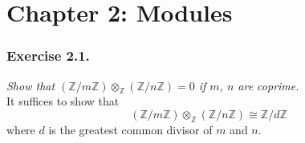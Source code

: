 \documentclass{article}
\begin{document}



\newpage
\section*{Chapter 2: Modules \\}



\subsubsection*{Exercise 2.1.}
\emph{Show that
$(\mathbb{Z}/m\mathbb{Z}) \otimes_{\mathbb{Z}} (\mathbb{Z}/n\mathbb{Z}) = 0$
if $m$, $n$ are coprime.} \\

It suffices to show that
$$(\mathbb{Z}/m\mathbb{Z}) \otimes_{\mathbb{Z}} (\mathbb{Z}/n\mathbb{Z})
\cong \mathbb{Z}/d\mathbb{Z}$$
where $d$ is the greatest common divisor of $m$ and $n$. \\
\end{document}
